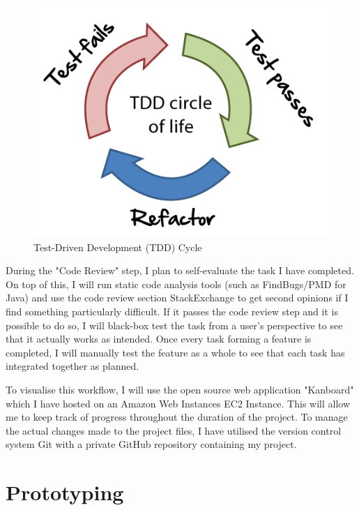 \documentclass[]{report}
\begin{document}
	\begin{figure}[H]
		\caption{
			Test-Driven Development (TDD) Cycle
			\cite{TDD Diagram}
		}
		\centering
		\includegraphics[scale=0.5]{tdd-circle-of-life.png}
	\end{figure}
	
	During the "Code Review" step, I plan to self-evaluate the task I have completed. On top of this, I will run static code analysis tools (such as FindBugs/PMD for Java) and use the code review section StackExchange to get second opinions if I find something particularly difficult. If it passes the code review step and it is possible to do so, I will black-box test the task from a user's perspective to see that it actually works as intended. Once every task forming a feature is completed, I will manually test the feature as a whole to see that each task has integrated together as planned.
	
	To visualise this workflow, I will use the open source web application "Kanboard" which I have hosted on an Amazon Web Instances EC2 Instance. This will allow me to keep track of progress throughout the duration of the project. To manage the actual changes made to the project files, I have utilised the version control system Git with a private GitHub repository containing my project.
	
	\chapter{Prototyping}
\end{document}
